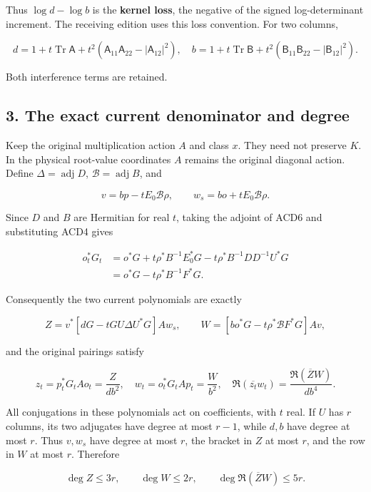 \documentclass[11pt]{article}
\begin{document}
Thus \(\log d-\log b\) is the \textbf{kernel loss}, the negative of the signed log-determinant increment. The receiving edition uses this loss convention. For two columns,

\[
d=1+t\operatorname{Tr}\mathsf A+t^2(\mathsf A_{11}\mathsf A_{22}-|\mathsf A_{12}|^2),\quad
b=1+t\operatorname{Tr}\mathsf B+t^2(\mathsf B_{11}\mathsf B_{22}-|\mathsf B_{12}|^2).
\]

Both interference terms are retained.

\subsection{3. The exact current denominator and degree}\label{the-exact-current-denominator-and-degree}

Keep the original multiplication action \(A\) and class \(x\). They need not preserve \(K\). In the physical root-value coordinates \(A\) remains the original diagonal action. Define \(\Delta=\operatorname{adj}D\), \(\mathcal B=\operatorname{adj}B\), and

\[
v=bp-tE_0\mathcal B\rho,\qquad w_s=bo+tE_0\mathcal B\rho.
\]

Since \(D\) and \(B\) are Hermitian for real \(t\), taking the adjoint of ACD6 and substituting ACD4 gives

\[
\begin{aligned}
o_t^*G_t
&=o^*G+t\rho^*B^{-1}E_0^*G
 -t\rho^*B^{-1}DD^{-1}U^*G\\
&=o^*G-t\rho^*B^{-1}F^*G .
\end{aligned}\tag{ACD10}
\]

Consequently the two current polynomials are exactly

\[
Z=v^*[dG-tGU\Delta U^*G]Aw_s,\qquad
W=[bo^*G-t\rho^*\mathcal B F^*G]Av,\tag{ACD11}
\]

and the original pairings satisfy

\[
z_t=p_t^*G_tAo_t=\frac{Z}{db^2},\quad
w_t=o_t^*G_tAp_t=\frac W{b^2},\quad
\Re(\overline{z_t}w_t)=\frac{\Re(\overline ZW)}{db^4}.\tag{ACD12}
\]

All conjugations in these polynomials act on coefficients, with \(t\) real. If \(U\) has \(r\) columns, its two adjugates have degree at most \(r-1\), while \(d,b\) have degree at most \(r\). Thus \(v,w_s\) have degree at most \(r\), the bracket in \(Z\) at most \(r\), and the row in \(W\) at most \(r\). Therefore

\[
\deg Z\le3r,\qquad\deg W\le2r,\qquad
\deg\Re(\overline ZW)\le5r.\tag{ACD13}
\]
\end{document}

